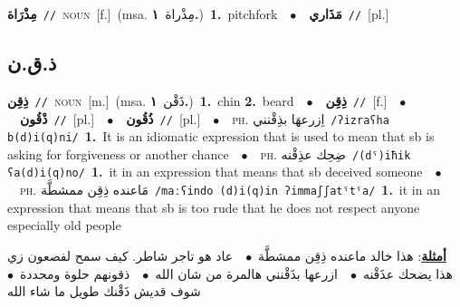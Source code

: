 \documentclass[10pt,a4paper,twoside]{article} %
\begin{document}
\begin{multicols}{2}
{\setlength\topsep{0pt}\textbf{\foreignlanguage{arabic}{مِذْرَاة}}\ {\color{gray}\texttt{//}\color{black}}\ \textsc{noun}\ [f.]\ \color{gray}(msa. \foreignlanguage{arabic}{مِذْراة}~\foreignlanguage{arabic}{\textbf{١.}})\color{black}\ \textbf{1.}~pitchfork\ \ $\bullet$\ \ \setlength\topsep{0pt}\textbf{\foreignlanguage{arabic}{مَذَاري}}\ {\color{gray}\texttt{//}\color{black}}\ [pl.]\ } \vspace{2mm}

\vspace{-3mm}
\subsection*{\color{blue}\foreignlanguage{arabic}{ذ.ق.ن}\color{blue}{}} 

{\setlength\topsep{0pt}\textbf{\foreignlanguage{arabic}{ذِقِن}}\ {\color{gray}\texttt{//}\color{black}}\ \textsc{noun}\ [m.]\ \color{gray}(msa. \foreignlanguage{arabic}{ذَقْن}~\foreignlanguage{arabic}{\textbf{١.}})\color{black}\ \textbf{1.}~chin  \textbf{2.}~beard\ \ $\bullet$\ \ \setlength\topsep{0pt}\textbf{\foreignlanguage{arabic}{ذِقِن}}\ {\color{gray}\texttt{//}\color{black}}\ [f.]\ \ $\bullet$\ \ \setlength\topsep{0pt}\textbf{\foreignlanguage{arabic}{ذْقُون}}\ {\color{gray}\texttt{//}\color{black}}\ [pl.]\ \ $\bullet$\ \ \setlength\topsep{0pt}\textbf{\foreignlanguage{arabic}{ذُقُون}}\ {\color{gray}\texttt{//}\color{black}}\ [pl.]\ \ $\bullet$\ \ \textsc{ph.} \color{gray} \foreignlanguage{arabic}{اِزرعهَا بذِقْنني}\color{black}\ {\color{gray}\texttt{/{\sffamily ʔizraʕha b(d)i(q)ni}/}\color{black}}\ \textbf{1.}~It is an idiomatic expression that is used to mean that sb is asking for forgiveness or another chance\ \ $\bullet$\ \ \textsc{ph.} \color{gray} \foreignlanguage{arabic}{ضِحِك عذِقْنه}\color{black}\ {\color{gray}\texttt{/{\sffamily (dˤ)iħik ʕa(d)i(q)no}/}\color{black}}\ \textbf{1.}~it in an expression that means that sb deceived someone\ \ $\bullet$\ \ \textsc{ph.} \color{gray} \foreignlanguage{arabic}{مَاعنده ذِقِن ممشطَّة}\color{black}\ {\color{gray}\texttt{/{\sffamily maːʕindo (d)i(q)in ʔimmaʃʃatˤtˤa}/}\color{black}}\ \textbf{1.}~it in an expression that means that sb is too rude that he does not respect anyone especially old people\  \begin{flushright}\color{gray}\foreignlanguage{arabic}{\textbf{\underline{\foreignlanguage{arabic}{أمثلة}}}: هذا خالد ماعنده ذِقِن ممشطَّة\ $\bullet$\ \  عاد هو تاجر شاطر. كيف سمح لفصعون زي هذا يضحك عذَقْنه\ $\bullet$\ \  ازرعها بذَقْنني هالمرة من شان الله\ $\bullet$\ \  ذقونهم حلوة ومحددة\ $\bullet$\ \  شوف قديش ذَقْنك طويل ما شاء الله}\end{flushright}\color{black}} \vspace{2mm}


\end{multicols}
\end{document}
